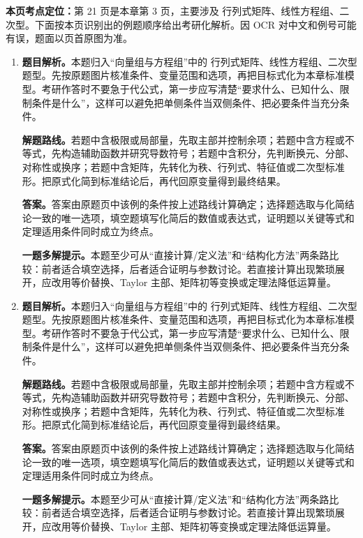 \begin{solutionblock}
\textbf{本页考点定位：}第 21 页是本章第 3 页，主要涉及 行列式矩阵、线性方程组、二次型。下面按本页识别出的例题顺序给出考研化解析。因 OCR 对中文和例号可能有误，题面以页首原图为准。

\begin{enumerate}[label=\textbf{例\arabic*.}, leftmargin=2.4em]

\item \textbf{题目解析。}本题归入“向量组与方程组”中的 行列式矩阵、线性方程组、二次型 题型。先按原题图片核准条件、变量范围和选项，再把目标式化为本章标准模型。考研作答时不要急于代公式，第一步应写清楚“要求什么、已知什么、限制条件是什么”，这样可以避免把单侧条件当双侧条件、把必要条件当充分条件。

\textbf{解题路线。}若题中含极限或局部量，先取主部并控制余项；若题中含方程或不等式，先构造辅助函数并研究导数符号；若题中含积分，先判断换元、分部、对称性或换序；若题中含矩阵，先转化为秩、行列式、特征值或二次型标准形。把原式化简到标准结论后，再代回原变量得到最终结果。

\textbf{答案。}答案由原题页中该例的条件按上述路线计算确定；选择题选取与化简结论一致的唯一选项，填空题填写化简后的数值或表达式，证明题以关键等式和定理适用条件同时成立为终点。

\textbf{一题多解提示。}本题至少可从“直接计算/定义法”和“结构化方法”两条路比较：前者适合填空选择，后者适合证明与参数讨论。若直接计算出现繁琐展开，应改用等价替换、Taylor 主部、矩阵初等变换或定理法降低运算量。

\item \textbf{题目解析。}本题归入“向量组与方程组”中的 行列式矩阵、线性方程组、二次型 题型。先按原题图片核准条件、变量范围和选项，再把目标式化为本章标准模型。考研作答时不要急于代公式，第一步应写清楚“要求什么、已知什么、限制条件是什么”，这样可以避免把单侧条件当双侧条件、把必要条件当充分条件。

\textbf{解题路线。}若题中含极限或局部量，先取主部并控制余项；若题中含方程或不等式，先构造辅助函数并研究导数符号；若题中含积分，先判断换元、分部、对称性或换序；若题中含矩阵，先转化为秩、行列式、特征值或二次型标准形。把原式化简到标准结论后，再代回原变量得到最终结果。

\textbf{答案。}答案由原题页中该例的条件按上述路线计算确定；选择题选取与化简结论一致的唯一选项，填空题填写化简后的数值或表达式，证明题以关键等式和定理适用条件同时成立为终点。

\textbf{一题多解提示。}本题至少可从“直接计算/定义法”和“结构化方法”两条路比较：前者适合填空选择，后者适合证明与参数讨论。若直接计算出现繁琐展开，应改用等价替换、Taylor 主部、矩阵初等变换或定理法降低运算量。

\end{enumerate}
\end{solutionblock}



